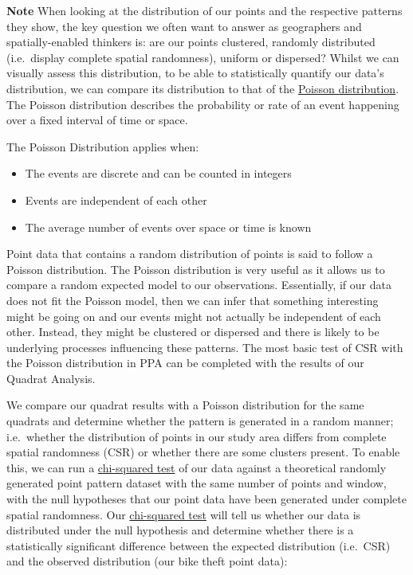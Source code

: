 \documentclass[
]{book}
\providecommand{\tightlist}{%
  \setlength{\itemsep}{0pt}\setlength{\parskip}{0pt}}
\begin{document}
\textbf{Note}
When looking at the distribution of our points and the respective patterns they show, the key question we often want to answer as geographers and spatially-enabled thinkers is: are our points clustered, randomly distributed (i.e.~display complete spatial randomness), uniform or dispersed? Whilst we can visually assess this distribution, to be able to statistically quantify our data's distribution, we can compare its distribution to that of the \href{https://en.wikipedia.org/wiki/Poisson_distribution}{Poisson distribution}. The Poisson distribution describes the probability or rate of an event happening over a fixed interval of time or space.

The Poisson Distribution applies when:

\begin{itemize}
\tightlist
\item
  The events are discrete and can be counted in integers
\item
  Events are independent of each other
\item
  The average number of events over space or time is known
\end{itemize}

Point data that contains a random distribution of points is said to follow a Poisson distribution. The Poisson distribution is very useful as it allows us to compare a random expected model to our observations. Essentially, if our data does not fit the Poisson model, then we can infer that something interesting might be going on and our events might not actually be independent of each other. Instead, they might be clustered or dispersed and there is likely to be underlying processes influencing these patterns. The most basic test of CSR with the Poisson distribution in PPA can be completed with the results of our Quadrat Analysis.

We compare our quadrat results with a Poisson distribution for the same quadrats and determine whether the pattern is generated in a random manner; i.e.~whether the distribution of points in our study area differs from complete spatial randomness (CSR) or whether there are some clusters present. To enable this, we can run a \href{https://en.wikipedia.org/wiki/Chi-squared_test}{chi-squared test} of our data against a theoretical randomly generated point pattern dataset with the same number of points and window, with the null hypotheses that our point data have been generated under complete spatial randomness. Our \href{https://en.wikipedia.org/wiki/Chi-squared_test}{chi-squared test} will tell us whether our data is distributed under the null hypothesis and determine whether there is a statistically significant difference between the expected distribution (i.e.~CSR) and the observed distribution (our bike theft point data):
\end{document}
